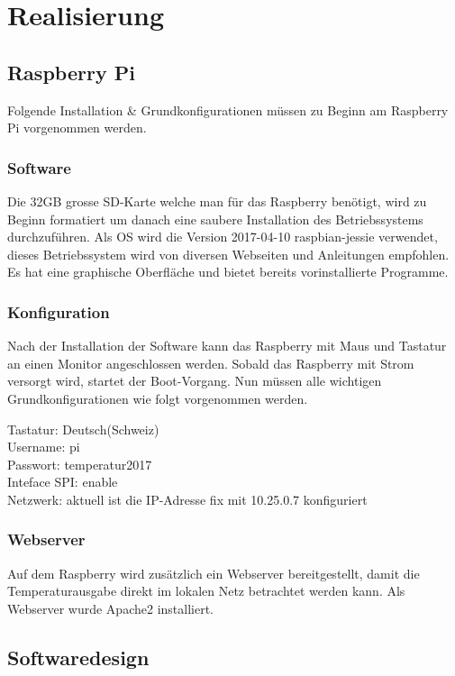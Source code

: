 \section{Realisierung}

\subsection{Raspberry Pi}

Folgende Installation \& Grundkonfigurationen müssen zu Beginn am Raspberry Pi vorgenommen werden.

\subsubsection{Software}
Die 32GB grosse SD-Karte welche man für das Raspberry benötigt, wird zu Beginn formatiert um danach eine saubere Installation des Betriebssystems durchzuführen. Als OS wird die Version 2017-04-10 raspbian-jessie verwendet, dieses Betriebssystem wird von diversen Webseiten und Anleitungen empfohlen. Es hat eine graphische Oberfläche und bietet bereits vorinstallierte Programme.

\subsubsection{Konfiguration}
Nach der Installation der Software kann das Raspberry mit Maus und Tastatur an einen Monitor angeschlossen werden. Sobald das Raspberry mit Strom versorgt wird, startet der Boot-Vorgang.
Nun müssen alle wichtigen Grundkonfigurationen wie folgt vorgenommen werden.

Tastatur: Deutsch(Schweiz)\\
Username: pi\\
Passwort: temperatur2017\\
Inteface SPI: enable\\
Netzwerk: aktuell ist die IP-Adresse fix mit 10.25.0.7 konfiguriert

\subsubsection{Webserver}
Auf dem Raspberry wird zusätzlich ein Webserver bereitgestellt, damit die Temperaturausgabe direkt im lokalen Netz betrachtet werden kann. Als Webserver wurde Apache2 installiert.


\subsection{Softwaredesign}

